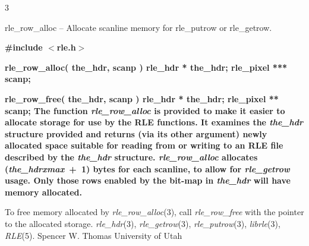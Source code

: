 %
%
%
 3
\begin{TPlist}{rle\_row\_alloc -- Allocate scanline memory for rle\_putrow or rle\_getrow.}
\item[{rle\_row\_alloc -- Allocate scanline memory for rle\_putrow or rle\_getrow.}]
\item[{rle\_row\_free -- Free scanline memory allocated by rle\_row\_alloc.}]
\end{TPlist}
\bf
\#include $<$rle.h$>$
\par\vspace{1.0\baselineskip}
\bf
rle\_row\_alloc( the\_hdr, scanp )
\nwl
\bf
rle\_hdr * the\_hdr;
\nwl
\bf
rle\_pixel *** scanp;
\par\vspace{1.0\baselineskip}
\bf
rle\_row\_free( the\_hdr, scanp )
\nwl
\bf
rle\_hdr * the\_hdr;
\nwl
\bf
rle\_pixel ** scanp;
The function
{\it rle\_row\_alloc}
is provided to make it easier to allocate storage for use by the RLE
functions.  It examines the
{\it the\_hdr}
structure provided and returns (via its other argument) newly
allocated space suitable for reading from or writing to an RLE file
described by the
{\it the\_hdr}
structure.
{\it rle\_row\_alloc}
allocates
{\rm (}{\it the\_hdr}{\rm }{\it xmax}{\rm \ +\ 1)}
bytes for each scanline, to allow for 
{\it rle\_getrow}
usage.  Only those rows enabled by the bit-map in
{\it the\_hdr}
will have memory allocated.

To free memory allocated by
{\it rle\_row\_alloc}{\rm (3),}
call
{\it rle\_row\_free}
with the pointer to the allocated storage.
{\it rle\_hdr}{\rm (3),}
{\it rle\_getrow}{\rm (3),}
{\it rle\_putrow}{\rm (3),}
{\it librle}{\rm (3),}
{\it RLE}{\rm (5).}
Spencer W. Thomas
\nwl
University of Utah

\newpage


